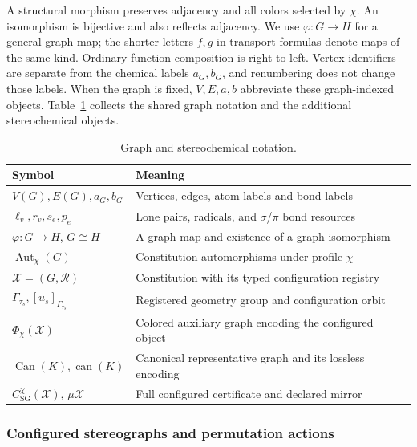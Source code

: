\documentclass[pdflatex,sn-mathphys-num,referee,lineno]{sn-jnl}
\theoremstyle{plain}
\theoremstyle{remark}
\theoremstyle{definition}
\begin{document}
A structural morphism preserves adjacency and all colors selected by \(\chi\).
An isomorphism is bijective and also reflects adjacency.
We use \(\varphi:G\to H\) for a general graph map; the shorter letters
\(f,g\) in transport formulas denote maps of the same kind. Ordinary function
composition is right-to-left. Vertex identifiers are separate from the
chemical labels \(a_G,b_G\), and renumbering does not change those labels.
When the graph is fixed, \(V,E,a,b\) abbreviate these graph-indexed objects.
Table~\ref{tab:notation} collects the shared graph notation and the additional
stereochemical objects.

\begin{table}[htbp]
\caption{Graph and stereochemical notation.}
\label{tab:notation}
\centering
\begin{tabularx}{\textwidth}{@{}lX@{}}
\toprule
Symbol & Meaning \\
\midrule
\(V(G),E(G),a_G,b_G\) & Vertices, edges, atom labels and bond labels \\
\(\ell_v,r_v,s_e,p_e\) & Lone pairs, radicals, and \(\sigma\)/\(\pi\) bond resources \\
\(\varphi:G\to H\), \(G\cong H\) & A graph map and existence of a graph isomorphism \\
\(\operatorname{Aut}_\chi(G)\) & Constitution automorphisms under profile \(\chi\) \\
\(\mathcal X=(G,\mathcal R)\) & Constitution with its typed configuration registry \\
\(\Gamma_{\tau_s},[u_s]_{\Gamma_{\tau_s}}\) & Registered geometry group and configuration orbit \\
\(\Phi_\chi(\mathcal X)\) & Colored auxiliary graph encoding the configured object \\
\(\operatorname{Can}(K),\operatorname{can}(K)\) & Canonical representative graph and its lossless encoding \\
\(C^\chi_{\mathrm{SG}}(\mathcal X)\), \(\mu\mathcal X\) & Full configured certificate and declared mirror \\
\bottomrule
\end{tabularx}
\end{table}

\subsubsection{Configured stereographs and permutation actions}
\label{sec:representation}
\end{document}
